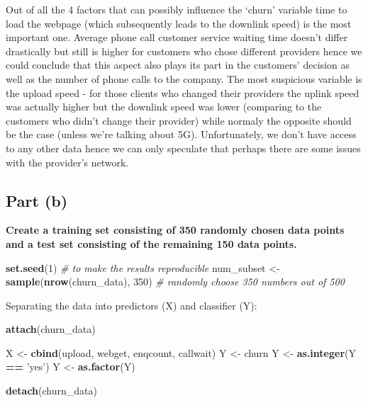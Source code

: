 \documentclass[
]{article}
\newenvironment{Shaded}{\begin{snugshade}}{\end{snugshade}}
\newcommand{\CommentTok}[1]{\textcolor[rgb]{0.56,0.35,0.01}{\textit{#1}}}
\newcommand{\DecValTok}[1]{\textcolor[rgb]{0.00,0.00,0.81}{#1}}
\newcommand{\KeywordTok}[1]{\textcolor[rgb]{0.13,0.29,0.53}{\textbf{#1}}}
\newcommand{\NormalTok}[1]{#1}
\newcommand{\OperatorTok}[1]{\textcolor[rgb]{0.81,0.36,0.00}{\textbf{#1}}}
\newcommand{\StringTok}[1]{\textcolor[rgb]{0.31,0.60,0.02}{#1}}
\begin{document}
Out of all the 4 factors that can possibly influence the `churn'
variable time to load the webpage (which subsequently leads to the
downlink speed) is the most important one. Average phone call customer
service waiting time doesn't differ drastically but still is higher for
customers who chose different providers hence we could conclude that
this aspect also plays its part in the customers' decision as well as
the number of phone calls to the company. The most suspicious variable
is the upload speed - for those clients who changed their providers the
uplink speed was actually higher but the downlink speed was lower
(comparing to the customers who didn't change their provider) while
normaly the opposite should be the case (unless we're talking about 5G).
Unfortunately, we don't have access to any other data hence we can only
speculate that perhaps there are some issues with the provider's
network.

\hypertarget{part-b}{%
\subsection{\texorpdfstring{\textbf{Part (b)}}{Part (b)}}\label{part-b}}

\textbf{Create a training set consisting of 350 randomly chosen data
points and a test set consisting of the remaining 150 data points.}

\begin{Shaded}
\begin{Highlighting}[]
\KeywordTok{set.seed}\NormalTok{(}\DecValTok{1}\NormalTok{) }\CommentTok{# to make the results reproducible}
\NormalTok{num_subset <-}\StringTok{ }\KeywordTok{sample}\NormalTok{(}\KeywordTok{nrow}\NormalTok{(churn_data), }\DecValTok{350}\NormalTok{) }\CommentTok{# randomly choose 350 numbers out of 500}
\end{Highlighting}
\end{Shaded}

Separating the data into predictors (X) and classifier (Y):

\begin{Shaded}
\begin{Highlighting}[]
\KeywordTok{attach}\NormalTok{(churn_data)}

\NormalTok{X <-}\StringTok{ }\KeywordTok{cbind}\NormalTok{(upload, webget, enqcount, callwait) }
\NormalTok{Y <-}\StringTok{ }\NormalTok{churn}
\NormalTok{Y <-}\StringTok{ }\KeywordTok{as.integer}\NormalTok{(Y }\OperatorTok{==}\StringTok{ 'yes'}\NormalTok{)}
\NormalTok{Y <-}\StringTok{ }\KeywordTok{as.factor}\NormalTok{(Y)}

\KeywordTok{detach}\NormalTok{(churn_data)}
\end{Highlighting}
\end{Shaded}
\end{document}
